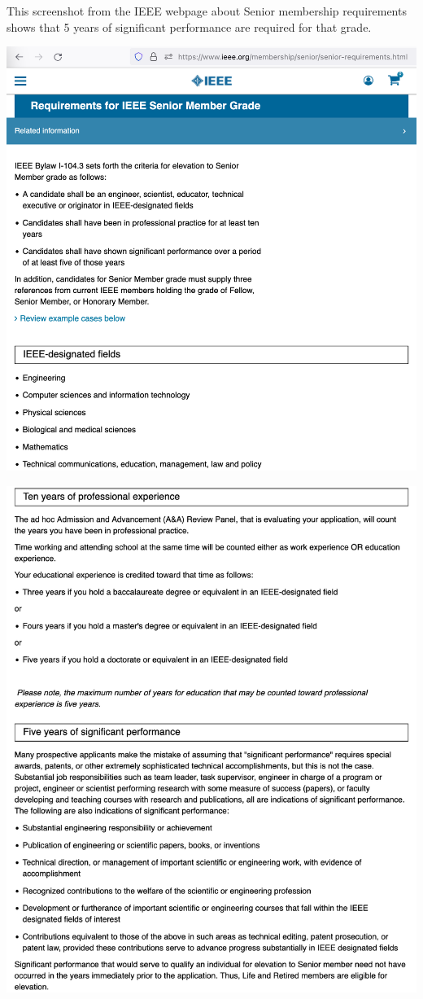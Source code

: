 
This screenshot from the IEEE webpage about Senior membership requirements
shows that 5 years of significant performance are required for that grade.

\includegraphics[width=\textwidth]{senior-requirements-p1}
\WillContinue

\Continuing
\includegraphics[width=\textwidth]{senior-requirements-p2}

\pagebreak

